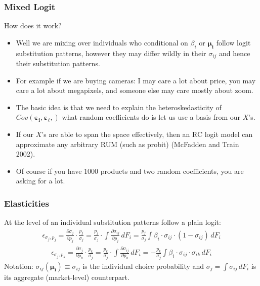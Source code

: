 \documentclass[aspectratio=169,11pt]{beamer}
\begin{document}
\begin{frame}
\frametitle{Mixed Logit}
How does it work?
 \begin{itemize}
\item Well we are mixing over individuals who conditional on $\beta_i$ or $\symbf{\mu_i}$ follow logit substitution patterns, however they may differ wildly in their $\sigma_{ij}$ and hence their substitution patterns.
\item For example if we are buying cameras: I may care a lot about price, you may care a lot about megapixels, and someone else may care mostly about zoom.
\item The basic idea is that we need to explain the heteroskedasticity of $Cov(\symbf{\varepsilon_i}, \symbf{\varepsilon_{\ell}},)$ what random coefficients do is let us use a basis from our $X$'s.
\item If our $X$'s are able to span the space effectively, then an RC logit model can approximate any arbitrary RUM (such as probit) (McFadden and Train 2002). 
\item Of course if you have 1000 products and two random coefficients, you are asking for a lot.
 \end{itemize}
\end{frame}

\begin{frame}
\frametitle{Elasticities}
At the level of an individual substitution patterns follow a plain logit:
\begin{align*}
\epsilon_{\sigma_j,p_j} = \frac{\partial \sigma_{j}}{\partial p_j} \cdot \frac{p_j}{\sigma_{j}}
=\frac{p_j}{\sigma_{j}}  \cdot \int \frac{\partial \sigma_{ij}}{\partial p_j}  \, d F_i 
= \frac{p_j}{\sigma_{j}}  \int \beta_i \cdot \sigma_{ij} \cdot (1-\sigma_{ij} ) \,d F_i 
\end{align*}
\begin{align*}
\epsilon_{\sigma_j,p_k} = \frac{\partial \sigma_{j}}{\partial p_k} \cdot \frac{p_k}{\sigma_{j}}
=\frac{p_k}{\sigma_{j}}  \cdot \int \frac{\partial \sigma_{ij}}{\partial p_k} \,  d F_i 
=- \frac{p_k}{\sigma_{j}}  \int \beta_i \cdot \sigma_{ij}\cdot \sigma_{ik}\, d F_i 
\end{align*}
Notation: $\sigma_{ij}(\symbf{\mu_i}) \equiv \sigma_{ij}$ is the individual choice probability and $\sigma_j = \int \sigma_{ij}\, d F_i$ is its aggregate (market-level) counterpart.
\end{frame}
\end{document}
